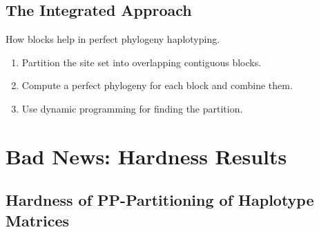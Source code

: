 \documentclass{beamer}
\begin{document}
\subsection{The Integrated Approach}

\begin{frame}{How blocks help in perfect phylogeny haplotyping.}
  \begin{enumerate}
  \item Partition the site set into overlapping contiguous blocks.
  \item Compute a perfect phylogeny for each block and combine them.
  \item Use dynamic programming for finding the partition.
  \end{enumerate}

\end{frame}



\section{Bad News: Hardness Results}

\subsection{Hardness of PP-Partitioning of Haplotype Matrices}
\end{document}

